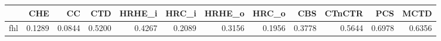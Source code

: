 \begin{tabular}{lrrrrrrrrrrr}
\toprule
 & CHE & CC & CTD & HRHE_i & HRC_i & HRHE_o & HRC_o & CBS & CTnCTR & PCS & MCTD \\
\midrule
fhl & 0.1289 & 0.0844 & 0.5200 & 0.4267 & 0.2089 & 0.3156 & 0.1956 & 0.3778 & 0.5644 & 0.6978 & 0.6356 \\
\bottomrule
\end{tabular}
